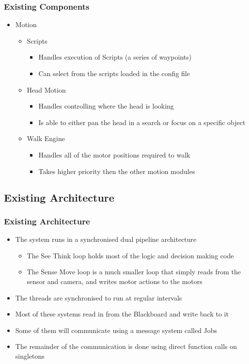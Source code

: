 \documentclass{beamer}
\begin{document}
\begin{frame}
	\frametitle{Existing Components}
	\begin{itemize}
		\item Motion
			\begin{itemize}
				\item Scripts
					\begin{itemize}
						\item Handles execution of Scripts (a series of waypoints)
						\item Can select from the scripts loaded in the config file
					\end{itemize}
				\item Head Motion
					\begin{itemize}
						\item Handles controlling where the head is looking
						\item Is able to either pan the head in a search or focus on a specific object
					\end{itemize}
				\item Walk Engine
					\begin{itemize}
						\item Handles all of the motor positions required to walk
						\item Takes higher priority then the other motion modules
					\end{itemize}
			\end{itemize}
	\end{itemize}
\end{frame}

\subsection{Existing Architecture}
\begin{frame}
	\frametitle{Existing Architecture}
	\begin{itemize}
		\item The system runs in a synchronised dual pipeline architecture
			\begin{itemize}
				\item The See Think loop holds most of the logic and decision making code
				\item The Sense Move loop is a much smaller loop that simply reads from the sensor and camera, and writes motor actions to the motors
			\end{itemize}
		\item The threads are synchronised to run at regular intervals
		\item Most of these systems read in from the Blackboard and write back to it
		\item Some of them will communicate using a message system called Jobs
		\item The remainder of the communication is done using direct function calls on singletons
	\end{itemize}
\end{frame}
\end{document}
